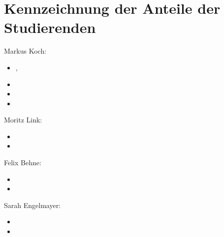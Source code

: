 \section{Kennzeichnung der Anteile der Studierenden}

Markus Koch:
\begin{itemize}
\item {}, 
\item {}
\item {}
\item {}
\end{itemize}

Moritz Link: 
\begin{itemize}
\item {}
\item {}
\end{itemize}

Felix Behne:
\begin{itemize}
\item {}
\item {}
\end{itemize}

Sarah Engelmayer: 
\begin{itemize}
\item {}
\item {}
\end{itemize}